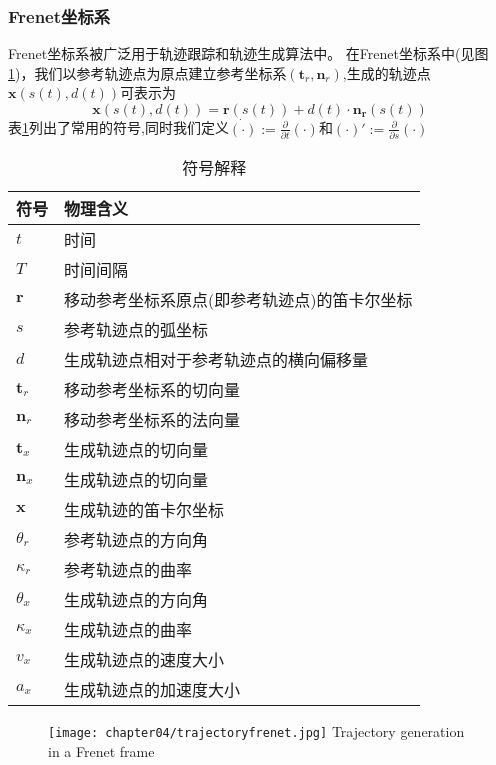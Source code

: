 \subsubsection{Frenet坐标系}
Frenet坐标系被广泛用于轨迹跟踪和轨迹生成算法中\cite{werling2010optimal}。
在Frenet坐标系中(见图\ref{fig:trajectoryfrenet})，我们以参考轨迹点为原点建立参考坐标系$(\bm{t}_r, \bm{n}_r)$,生成的轨迹点$\bm{x}(s(t),d(t))$可表示为
\begin{equation}
  \label{eq:frenetcoordinate}
  \bm{x}(s(t),d(t)) = \bm{r}(s(t)) + d(t) \cdot \bm{n_r}(s(t))
\end{equation}
表\ref{tab:frenetsymbol}列出了常用的符号,同时我们定义$\dot{(\cdot)}:=
\frac{\partial}{\partial t}(\cdot)$和$(\cdot)':=
\frac{\partial}{\partial s}(\cdot)$

\begin{table}[htbp]
  \centering
  \caption{符号解释}
    \begin{tabular}{ll}
    \toprule
    符号    & 物理含义 \\
    \midrule
    $t$          & 时间 \\
    $T$          & 时间间隔 \\
    $\bm{r}$     & 移动参考坐标系原点(即参考轨迹点)的笛卡尔坐标 \\
    $s$          & 参考轨迹点的弧坐标 \\
    $d$          & 生成轨迹点相对于参考轨迹点的横向偏移量 \\
    $\bm{t}_r$   & 移动参考坐标系的切向量 \\
    $\bm{n}_r$   & 移动参考坐标系的法向量 \\
    $\bm{t}_x$   & 生成轨迹点的切向量 \\
    $\bm{n}_x$   & 生成轨迹点的切向量 \\
    $\bm{x}$     & 生成轨迹的笛卡尔坐标 \\
    $\theta_r$   & 参考轨迹点的方向角 \\
    $\kappa_r$   & 参考轨迹点的曲率 \\
    $\theta_x$   & 生成轨迹点的方向角 \\
    $\kappa_x$   & 生成轨迹点的曲率 \\
    $v_x$  & 生成轨迹点的速度大小 \\
    $a_x$  & 生成轨迹点的加速度大小 \\
    \bottomrule
    \end{tabular}%
  \label{tab:frenetsymbol}%
\end{table}%

\begin{figure}[!htp]
  \centering
  \texttt{[image: chapter04/trajectoryfrenet.jpg]}
    {Trajectory generation in a Frenet frame}
  \label{fig:trajectoryfrenet}
\end{figure}


